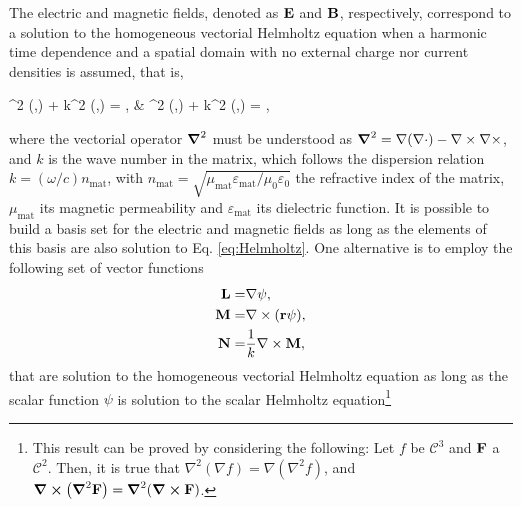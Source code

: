 
The electric and magnetic fields, denoted as $\vb{E}$ and $\vb{B}$, respectively, correspond to a solution to the homogeneous vectorial Helmholtz equation when a harmonic time dependence and a spatial domain with no external charge nor current densities is assumed, that is,
%
\begin{tcolorbox}[title = Vectorial Helmholtz Equation,	ams align, breakable]
	\grad^2 (,\omega) + k^2 (,\omega) = ,
		\qquad&\qquad
  	\grad^2 (,\omega) + k^2 (,\omega) = ,
  	\label{eq:Helmholtz}
\end{tcolorbox}
%
\noindent where the vectorial operator $\grad^2$ must be understood as $\grad^2 = \nabla(\nabla\cdot) - \nabla\times\nabla\times $, and $k$ is the wave number in the matrix, which follows the dispersion relation $k = (\omega/c) n_\text{mat}$, with $n_\text{mat}=\sqrt{\mu_\text{mat}\varepsilon_\text{mat} /\mu_0\varepsilon_0}$ the refractive index of the matrix, $\mu_\text{mat}$ its magnetic permeability and $\varepsilon_\text{mat}$ its dielectric function. It is possible to build a basis set for the electric and magnetic fields as long as the elements of this basis are also solution to Eq. \eqref{eq:Helmholtz}. One alternative is to employ the following set of vector functions \cite{stratton_electromagnetic_2012}
%
\begin{subequations}
\begin{align}
	\vb{L} =& \nabla \psi,
	\label{eq:L}\\
	\vb{M} =& \nabla\times(\vb{r}\psi),
	\label{eq:M}\\
	\vb{N} =&  \frac{1}{k}\nabla\times\vb{M},
	\label{eq:N}
\end{align}%
\label{eq:VSH}%
\end{subequations}
%
that are solution to the homogeneous vectorial Helmholtz equation as long as the scalar function $\psi$ is solution to the scalar Helmholtz equation\footnote{%
	This result can be proved by considering the following: Let $f$ be $\mathcal{C}^3$ and $\vb{F}$ a $\mathcal{C}^2$. Then, it is true that $\nabla^2(\nabla f) = \nabla(\nabla^2 f)$, and $\curl(\grad^2\vb{F}) = \grad^2(\curl\vb{F})$. }%
%
